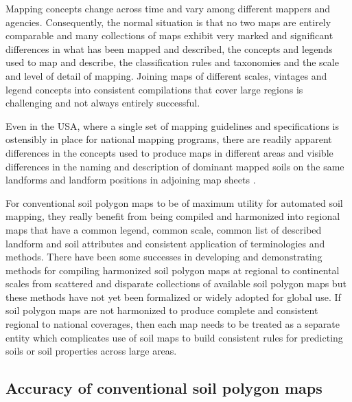 \documentclass[11pt]{krantz}
\theoremstyle{definition}
\theoremstyle{definition}
\theoremstyle{definition}
\theoremstyle{remark}
\begin{document}
Mapping concepts change across time and vary among different mappers and
agencies. Consequently, the normal situation is that no two maps are
entirely comparable and many collections of maps exhibit very marked and
significant differences in what has been mapped and described, the
concepts and legends used to map and describe, the classification rules
and taxonomies and the scale and level of detail of mapping. Joining
maps of different scales, vintages and legend concepts into consistent
compilations that cover large regions is challenging and not always
entirely successful.

Even in the USA, where a single set of mapping guidelines and
specifications is ostensibly in place for national mapping programs,
there are readily apparent differences in the concepts used to produce
maps in different areas and visible differences in the naming and
description of dominant mapped soils on the same landforms and landform
positions in adjoining map sheets \citep{LathropJr19951, ZHONG2011491}.

For conventional soil polygon maps to be of maximum utility for
automated soil mapping, they really benefit from being compiled and
harmonized into regional maps that have a common legend, common scale,
common list of described landform and soil attributes and consistent
application of terminologies and methods. There have been some successes
in developing and demonstrating methods for compiling harmonized soil
polygon maps at regional to continental scales from scattered and
disparate collections of available soil polygon maps
\citep{Bui2003Geoderma, Grinand2008Geoderma} but these methods have not
yet been formalized or widely adopted for global use. If soil polygon
maps are not harmonized to produce complete and consistent regional to
national coverages, then each map needs to be treated as a separate
entity which complicates use of soil maps to build consistent rules for
predicting soils or soil properties across large areas.

\hypertarget{accuracy-of-conventional-soil-polygon-maps}{%
\subsection{Accuracy of conventional soil polygon
maps}\label{accuracy-of-conventional-soil-polygon-maps}}
\end{document}
